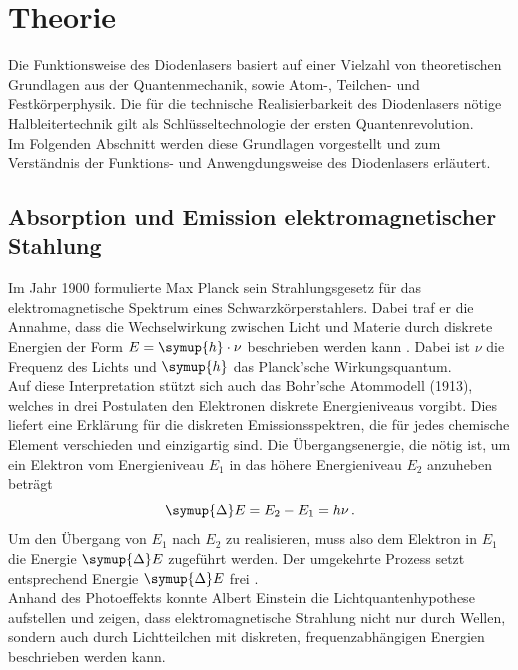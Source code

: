 \section{Theorie}
\label{sec:Theorie}
    Die Funktionsweise des Diodenlasers basiert auf einer Vielzahl von theoretischen Grundlagen aus der Quantenmechanik, sowie Atom-, Teilchen- und Festkörperphysik.
    Die für die technische Realisierbarkeit des Diodenlasers nötige Halbleitertechnik gilt als Schlüsseltechnologie der ersten Quantenrevolution.\\
    Im Folgenden Abschnitt werden diese Grundlagen vorgestellt und zum Verständnis der Funktions- und Anwengdungsweise des Diodenlasers erläutert.
    
    \subsection{Absorption und Emission elektromagnetischer Stahlung}
        Im Jahr 1900 formulierte Max Planck sein Strahlungsgesetz für das elektromagnetische Spektrum eines Schwarzkörperstahlers.
        Dabei traf er die Annahme, dass die Wechselwirkung zwischen Licht und Materie durch diskrete Energien der Form $E = \symup{h}\cdot\nu$ beschrieben werden kann \cite[52]{haken_wolf_2004}.
        Dabei ist $\nu$ die Frequenz des Lichts und $\symup{h}$ das Planck'sche Wirkungsquantum.
        \\
        Auf diese Interpretation stützt sich auch das Bohr'sche Atommodell (1913), welches in drei Postulaten den Elektronen diskrete Energieniveaus vorgibt.
        Dies liefert eine Erklärung für die diskreten Emissionsspektren, die für jedes chemische Element verschieden und einzigartig sind.
        Die Übergangsenergie, die nötig ist, um ein Elektron vom Energieniveau $E_1$ in das höhere Energieniveau $E_2$ anzuheben beträgt
        \begin{equation}
            \symup{\Delta}E = E_2 - E_1 = h\nu\,\mathrm{.}
            \label{eqn:planck}
        \end{equation}
        Um den Übergang von $E_1$ nach $E_2$ zu realisieren, muss also dem Elektron in $E_1$ die Energie $\symup{\Delta}E$ zugeführt werden.
        Der umgekehrte Prozess setzt entsprechend Energie $\symup{\Delta}E$ frei \cite[95]{haken_wolf_2004}.
        \\
        Anhand des Photoeffekts konnte Albert Einstein die Lichtquantenhypothese aufstellen und zeigen, dass elektromagnetische Strahlung nicht nur durch Wellen, sondern auch durch Lichtteilchen mit diskreten, frequenzabhängigen Energien beschrieben werden kann.
